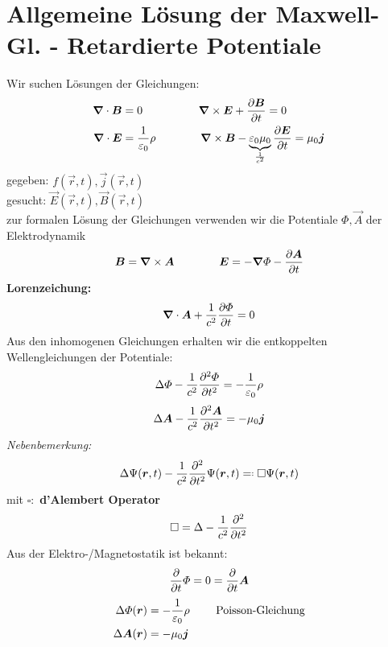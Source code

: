 
\section{Allgemeine Lösung der Maxwell-Gl. - Retardierte Potentiale}

Wir suchen Lösungen der Gleichungen:
\begin{align*}
\bm{\nabla} \cdot \bm{B} &= 0 \qquad \qquad \quad \bm{\nabla} \times \bm{E} + \frac{\partial \bm{B}}{\partial t} = 0\\
\bm{\nabla} \cdot \bm{E} &= \frac{1}{\varepsilon_0} \rho \qquad \qquad \bm{\nabla} \times \bm{B} - \underbrace{\varepsilon_0 \mu_0}_{\frac{1}{c^2}} \frac{\partial \bm{E}}{\partial t} = \mu_0 \bm{j}
\end{align*}
gegeben: $ f(\vec{r},t) , \vec{j}(\vec{r},t) $\\
gesucht: $ \vec{E}(\vec{r},t), \vec{B}(\vec{r},t) $\\[5pt]
zur formalen Lösung der Gleichungen verwenden wir die Potentiale $ \Phi , \vec{A} $ der Elektrodynamik
\begin{equation*}
\bm{B} = \bm{\nabla} \times \bm{A} \qquad \qquad \bm{E} = - \bm{\nabla} \varPhi - \frac{\partial \bm{A}}{\partial t}
\end{equation*}
\textbf{Lorenzeichung:}
\begin{equation*}
\bm{\nabla} \cdot \bm{A} + \frac{1}{c^2} \frac{\partial \varPhi}{\partial t} = 0
\end{equation*}
Aus den inhomogenen Gleichungen erhalten wir die entkoppelten Wellengleichungen der Potentiale:
\begin{equation*}
\Delta \varPhi - \frac{1}{c^2} \frac{\partial ^2 \varPhi}{\partial t^2} = - \frac{1}{\varepsilon_0} \rho
\end{equation*}
\begin{equation*}
\Delta \bm{A} - \frac{1}{c^2} \frac{\partial ^2 \bm{A}}{\partial t^2} = - \mu_0 \bm{j}
\end{equation*}
\emph{Nebenbemerkung:}
\begin{equation*}
\Delta \Psi (\vec{r},t) - \frac{1}{c^2} \prt{^2}{t^2} \Psi (\vec{r},t) \eqdef \square \Psi (\vec{r},t)
\end{equation*}
mit $ \square : $ \textbf{d'Alembert Operator}
\begin{equation*}
\square = \Delta - \frac{1}{c^2} \frac{\partial ^2}{\partial t^2}
\end{equation*}
Aus der Elektro-/Magnetostatik ist bekannt:
\begin{equation*}
\frac{\partial }{\partial t} \varPhi = 0 = \frac{\partial }{\partial t} \bm{A}
\end{equation*}
\begin{align*}
\Delta \varPhi(\bm{r}) &= - \frac{1}{\varepsilon_0} \rho \qquad \textrm{ Poisson-Gleichung}\\
\Delta \bm{A}(\bm{r}) &= - \mu_0 \bm{j}
\end{align*}
